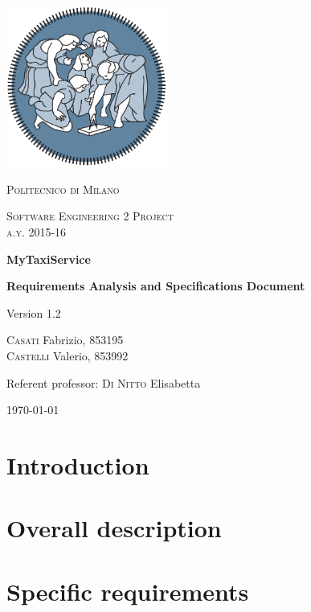 



\begin{titlepage}
	\centering
	\includegraphics[width=150pt]{images/polimi_logo}\par\vspace{1cm}
	{\scshape\LARGE
		Politecnico di Milano\par}
	\vspace{1cm}
	{\scshape\Large
		Software Engineering 2 Project\\
		a.y. 2015-16\par}
	\vspace{1.5cm}
	{\huge\bfseries
		MyTaxiService\\\par}
	{\Large\bfseries
		Requirements Analysis and Specifications Document\par}
	Version 1.2\par
	\vspace{2cm}
	{\Large
		{\scshape Casati} Fabrizio, 853195\\
		{\scshape Castelli} Valerio, 853992\par}
	\vfill
	Referent professor: {\scshape Di Nitto} Elisabetta\par
	\vfill
	{\large\today\par}
\end{titlepage}

\tableofcontents

\chapter{Introduction}


\chapter{Overall description}


\chapter{Specific requirements}


